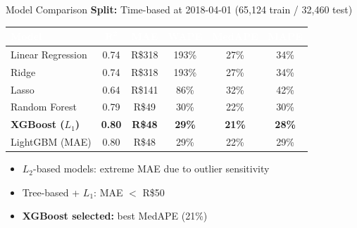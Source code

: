 \documentclass[aspectratio=169,10pt]{beamer}
\begin{document}
\begin{frame}{Model Comparison}
  \textbf{Split:} Time-based at 2018-04-01 (65{,}124 train / 32{,}460 test)

  \vspace{8pt}
  \small
  \begin{tabular}{l ccccc}
    \toprule
    \rowcolor{brandcolor}
    \textcolor{white}{\textbf{Model}} & \textcolor{white}{$\boldsymbol{R^{2}}$}
      & \textcolor{white}{\textbf{MAE}} & \textcolor{white}{\textbf{WAPE}}
      & \textcolor{white}{\textbf{MedAPE}} & \textcolor{white}{\textbf{MAPE}} \\
    \midrule
    Linear Regression & 0.74 & R\$318 & 193\% & 27\% & 34\% \\
    Ridge             & 0.74 & R\$318 & 193\% & 27\% & 34\% \\
    Lasso             & 0.64 & R\$141 &  86\% & 32\% & 42\% \\
    Random Forest     & 0.79 &  R\$49 &  30\% & 22\% & 30\% \\
    \rowcolor{accentcolor!20}
    \textbf{XGBoost ($L_1$)} & \textbf{0.80} & \textbf{R\$48} & \textbf{29\%} & \textbf{21\%} & \textbf{28\%} \\
    LightGBM (MAE)    & 0.80 &  R\$48 &  29\% & 22\% & 29\% \\
    \bottomrule
  \end{tabular}

  \vspace{8pt}
  \begin{itemize}
    \item $L_{2}$-based models: extreme MAE due to outlier sensitivity
    \item Tree-based + $L_{1}$: MAE $<$ R\$50
    \item \textbf{XGBoost selected:} best MedAPE (21\%)
  \end{itemize}
\end{frame}
\end{document}

